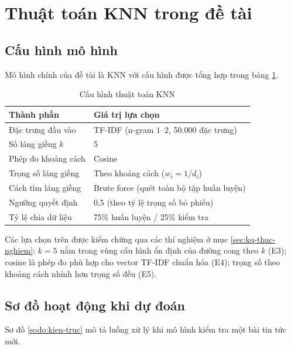 \section{Thuật toán KNN trong đề tài}

\subsection{Cấu hình mô hình}

Mô hình chính của đề tài là KNN với cấu hình được tổng hợp trong bảng \ref{tab:tham-so-mo-hinh}.

\begin{table}[H]
\centering
\caption{Cấu hình thuật toán KNN}
\label{tab:tham-so-mo-hinh}
\begin{tabular}{|l|l|}
\hline
\textbf{Thành phần} & \textbf{Giá trị lựa chọn} \\
\hline
Đặc trưng đầu vào & TF-IDF (n-gram $1$--$2$, 50.000 đặc trưng) \\
\hline
Số láng giềng $k$ & 5 \\
\hline
Phép đo khoảng cách & Cosine \\
\hline
Trọng số láng giềng & Theo khoảng cách ($w_i = 1/d_i$) \\
\hline
Cách tìm láng giềng & Brute force (quét toàn bộ tập huấn luyện) \\
\hline
Ngưỡng quyết định & 0,5 (theo tỷ lệ trọng số bỏ phiếu) \\
\hline
Tỷ lệ chia dữ liệu & 75\% huấn luyện / 25\% kiểm tra \\
\hline
\end{tabular}
\end{table}

Các lựa chọn trên được kiểm chứng qua các thí nghiệm ở mục \ref{sec:kq-thuc-nghiem}: $k = 5$ nằm trong vùng cấu hình ổn định của đường cong theo $k$ (E3); cosine là phép đo phù hợp cho vector TF-IDF chuẩn hóa (E4); trọng số theo khoảng cách nhỉnh hơn trọng số đều (E5).

\subsection{Sơ đồ hoạt động khi dự đoán}

Sơ đồ \ref{sodo:kien-truc} mô tả luồng xử lý khi mô hình kiểm tra một bài tin tức mới.


